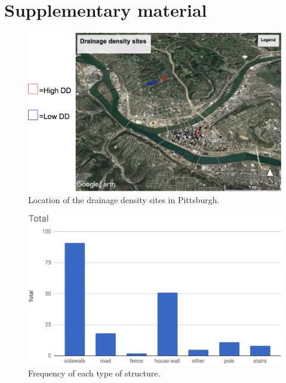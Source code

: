 \documentclass[final,12pt,times,twocolumn,authoryear]{elsarticle}
\begin{document}



\newpage

\appendix

\onecolumn

\renewcommand\thefigure{SM.\arabic{figure}}    
\setcounter{figure}{0}    

\section*{Supplementary material}
\label{s:sm}

\begin{figure}[hbt]
	\centering
	\includegraphics[width=\linewidth]{fig/ddmap}
	\caption{Location of the drainage density sites in Pittsburgh.}
	\label{fig:map}
\end{figure}

\begin{figure}[hbt]
	\centering
	\includegraphics[width=\linewidth]{fig/aggregatedamagetype}
	\caption{Frequency of each type of structure.}
	\label{fig:histtype}
\end{figure}
\end{document}
